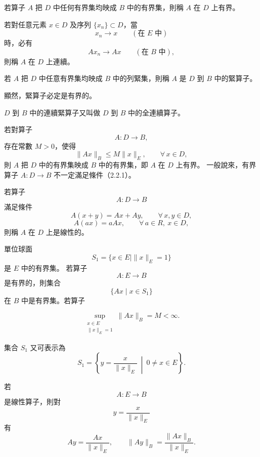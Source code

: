 \documentclass[11pt,a4paper,twoside]{article}
\newcommand{\pnum}[1]{%
    \makebox[0pt][r]{%
        \scriptsize\textbf{[#1]}\hspace{0.7em}%
    }%
}
\begin{document}
\noindent
\pnum{69}
若算子 $A$ 把 $D$ 中任何有界集均映成 $B$ 中的有界集，則稱 $A$ 在 $D$ 上有界。

\noindent
\pnum{70}
若對任意元素 $x\in D$ 及序列 $\{x_n\}\subset D$，當
\[
    x_n\to x
    \qquad
    (\text{在 }E\text{ 中})
\]
時，必有
\[
    Ax_n\to Ax
    \qquad
    (\text{在 }B\text{ 中}),
\]
則稱 $A$ 在 $D$ 上連續。

\noindent
\pnum{71}
若 $A$ 把 $D$ 中任意有界集均映成 $B$ 中的列緊集，則稱 $A$ 是 $D$ 到 $B$ 中的緊算子。

顯然，緊算子必定是有界的。

$D$ 到 $B$ 中的連續緊算子又叫做 $D$ 到 $B$ 中的全連續算子。

\noindent
\pnum{72}
若對算子
\[
    A:D\longrightarrow B,
\]
存在常數 $M>0$，使得
\begin{equation}
    \|Ax\|_B
    \le
    M\|x\|_E,
    \qquad
    \forall\,x\in D,
    \tag{2.2.1}
\end{equation}
則 $A$ 把 $D$ 中的有界集映成 $B$ 中的有界集，即 $A$ 在 $D$ 上有界。
一般說來，有界算子 $A:D\to B$ 不一定滿足條件（2.2.1）。

\noindent
\pnum{73}
若算子
\[
    A:D\longrightarrow B
\]
滿足條件
\[
    A(x+y)=Ax+Ay,
    \qquad
    \forall\,x,y\in D,
\]
\[
    A(ax)=aAx,
    \qquad
    \forall\,a\in R,\ x\in D,
\]
則稱 $A$ 在 $D$ 上是線性的。

\noindent
\pnum{74}
單位球面
\[
    S_1
    =
    \{x\in E\mid \|x\|_E=1\}
\]
是 $E$ 中的有界集。
若算子
\[
    A:E\longrightarrow B
\]
是有界的，則集合
\[
    \{Ax\mid x\in S_1\}
\]
在 $B$ 中是有界集。若算子

\newpage

\noindent
\pnum{75}
\[
    \sup_{\substack{x\in E\\ \|x\|_E=1}}
    \|Ax\|_B
    =
    M
    <
    \infty.
\]

集合 $S_1$ 又可表示為
\begin{equation}
    S_1
    =
    \left\{
    y=\frac{x}{\|x\|_E}
    \ \middle|\
    0\neq x\in E
    \right\}.
    \tag{2.2.2}
\end{equation}

\noindent
\pnum{76}
若
\[
    A:E\longrightarrow B
\]
是線性算子，則對
\[
    y=\frac{x}{\|x\|_E}
\]
有
\begin{equation}
    Ay
    =
    \frac{Ax}{\|x\|_E},
    \qquad
    \|Ay\|_B
    =
    \frac{\|Ax\|_B}{\|x\|_E}.
    \tag{2.2.3}
\end{equation}
\end{document}

